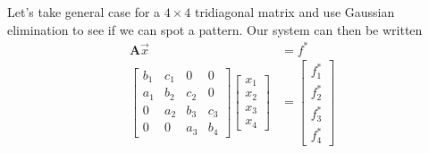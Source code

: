 \documentclass[10pt, a4paper]{amsart}
\begin{document}
Let's take general case for a $4\times 4$ tridiagonal matrix and use Gaussian elimination to see if we can spot a pattern.
Our system can then be written 
\begin{align}
	\mathbf{A}\vec{x} &= f^*\nonumber\\
	\begin{bmatrix}
		b_1 & c_1 & 0 & 0\\
		a_1 & b_2 & c_2 & 0\\
		0 & a_2 & b_3 & c_3 \\
		0 & 0 & a_3 & b_4 
	\end{bmatrix}
	\begin{bmatrix}
		x_1\\
		x_2\\
		x_3\\
		x_4
	\end{bmatrix}
	&= 
	\begin{bmatrix}
		f^*_1\\
		f^*_2\\
		f^*_3\\
		f^*_4
	\end{bmatrix}
\end{align}
\end{document}
